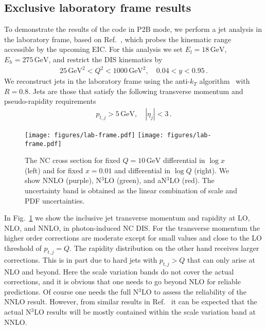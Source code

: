 \documentclass[submission, PhysCodeb]{SciPost_better_arXiv}
\newcommand{\GEV}{\,\mathrm{GeV}}
\newcommand{\NNNLO}{N$^3$LO}
\begin{document}
\subsection{Exclusive laboratory frame results}
To demonstrate the results of the code in P2B mode, we perform a jet
analysis in the laboratory frame, based on Ref.~\cite{Borsa:2022cap},
which probes the kinematic range accessible by the upcoming EIC. For
this analysis we set $E_l=18\GEV$, $E_h=275\GEV$, and restrict the DIS
kinematics by
\begin{align}
  25\GEV^2 < Q^2 < 1000 \GEV^2, \quad 0.04 < y < 0.95\,.
\end{align}
We reconstruct jets in the laboratory frame using the anti-$k_T$
algorithm~\cite{Cacciari:2008gp} with $R=0.8$. Jets are those that
satisfy the following transverse momentum and pseudo-rapidity requirements
\begin{align}
  p_{t,j} > 5 \GEV, \quad |\eta_j| < 3\,.
\end{align}
\begin{figure}[tb!]
  \centering\texttt{[image: figures/lab-frame.pdf]}
  \centering\texttt{[image: figures/lab-frame.pdf]}
  \caption{The NC cross section for fixed $Q=10\GEV$ differential in
    $\log x$ (left) and for fixed $x=0.01$ and differential in $\log
    Q$ (right). We show NNLO (purple), \NNNLO{} (green), and a\NNNLO{}
    (red). The uncertainty band is obtained as the linear combination
    of scale and PDF uncertainties.}
  \label{fig:labframe}
\end{figure}
In Fig.~\ref{fig:labframe} we show the inclusive jet transverse
momentum and rapidity at LO, NLO, and NNLO, in photon-induced NC
DIS. For the transverse momentum the higher order corrections are
moderate except for small values and close to the LO threshold of
$p_{t,j}=Q$. The rapidity distribution on the other hand receives
larger corrections. This is in part due to hard jets with $p_{t,j}>Q$
that can only arise at NLO and beyond. Here the scale variation bands
do not cover the actual corrections, and it is obvious that one needs
to go beyond NLO for reliable predictions. Of course one needs the
full \NNNLO{} to assess the reliability of the NNLO result. However,
from similar results in Ref.~\cite{Currie:2018fgr} it can be expected
that the actual \NNNLO{} results will be mostly contained within the
scale variation band at NNLO.
\end{document}
